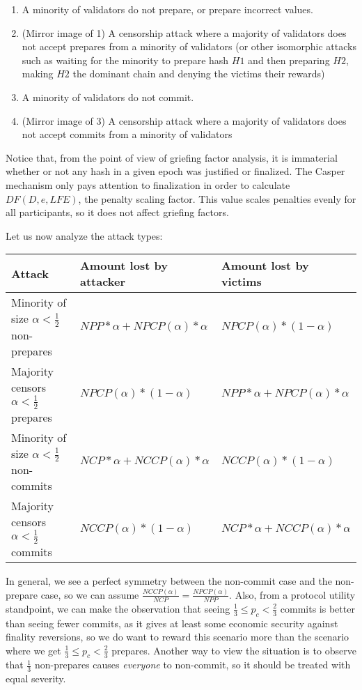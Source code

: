 \documentclass[12pt]{article}
\begin{document}
\begin{enumerate}
\item A minority of validators do not prepare, or prepare incorrect values.
\item (Mirror image of 1) A censorship attack where a majority of validators does not accept prepares from a minority of validators (or other isomorphic attacks such as waiting for the minority to prepare hash $H1$ and then preparing $H2$, making $H2$ the dominant chain and denying the victims their rewards)
\item A minority of validators do not commit.
\item (Mirror image of 3) A censorship attack where a majority of validators does not accept commits from a minority of validators
\end{enumerate}

Notice that, from the point of view of griefing factor analysis, it is immaterial whether or not any hash in a given epoch was justified or finalized. The Casper mechanism only pays attention to finalization in order to calculate $DF(D, e, LFE)$, the penalty scaling factor. This value scales penalties evenly for all participants, so it does not affect griefing factors.

Let us now analyze the attack types:

\begin{tabularx}{\textwidth}{|X|X|X|}
\hline
Attack & Amount lost by attacker & Amount lost by victims \\
\hline
Minority of size $\alpha < \frac{1}{2}$ non-prepares & $NPP * \alpha + NPCP(\alpha) * \alpha$ & $NPCP(\alpha) * (1-\alpha)$ \\
Majority censors $\alpha < \frac{1}{2}$ prepares & $NPCP(\alpha) * (1-\alpha)$ & $NPP * \alpha + NPCP(\alpha) * \alpha$ \\
Minority of size $\alpha < \frac{1}{2}$ non-commits & $NCP * \alpha + NCCP(\alpha) * \alpha$ & $NCCP(\alpha) * (1-\alpha)$ \\
Majority censors $\alpha < \frac{1}{2}$ commits & $NCCP(\alpha) * (1-\alpha)$ & $NCP * \alpha + NCCP(\alpha) * \alpha$ \\
\hline
\end{tabularx}

In general, we see a perfect symmetry between the non-commit case and the non-prepare case, so we can assume $\frac{NCCP(\alpha)}{NCP} = \frac{NPCP(\alpha)}{NPP}$. Also, from a protocol utility standpoint, we can make the observation that seeing $\frac{1}{3} \le p_c < \frac{2}{3}$ commits is better than seeing fewer commits, as it gives at least some economic security against finality reversions, so we do want to reward this scenario more than the scenario where we get $\frac{1}{3} \le p_c < \frac{2}{3}$ prepares. Another way to view the situation is to observe that $\frac{1}{3}$ non-prepares causes \textit{everyone} to non-commit, so it should be treated with equal severity.
\end{document}
